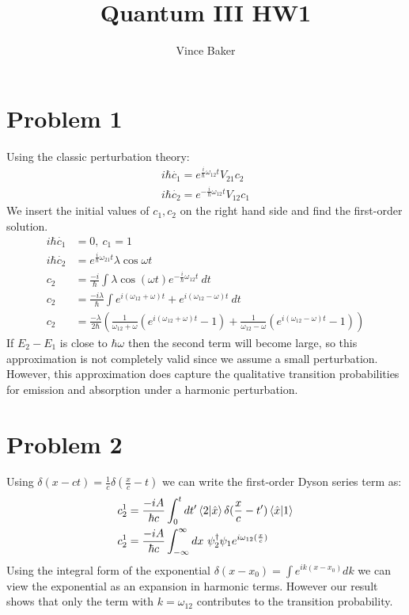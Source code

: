 \documentclass[a4paper,11pt]{article}
\title{Quantum III HW1}
\author{Vince Baker}
\numberwithin{equation}{section}
\begin{document}
\maketitle

\section{Problem 1}
Using the classic perturbation theory:
\begin{align}
 i\hbar \dot{c_1}=e^{\frac{i}{\hbar}\omega_{12}t}V_{21}c_2\\
 i\hbar \dot{c_2}=e^{-\frac{i}{\hbar}\omega_{12}t}V_{12}c_1
\end{align}
We insert the initial values of $c_1,c_2$ on the right hand side and find the first-order solution.
\begin{align}
 i\hbar \dot{c_1} &=0,\ c_1=1\\
 i\hbar \dot{c_2} &=e^{\frac{i}{\hbar}\omega_{21}t}\lambda\cos{\omega t}\\
 c_2 &=\frac{-i}{\hbar}\int \lambda \cos{(\omega t)}e^{-\frac{i}{\hbar}\omega_{12}t}\ dt\\
 c_2 &=\frac{-i\lambda}{\hbar}\int e^{i(\omega_{12}+\omega)t}+e^{i(\omega_{12}-\omega)t}\ dt\\
 c_2 &= \frac{-\lambda}{2\hbar}\left(\frac{1}{\omega_{12}+\omega}(e^{i(\omega_{12}+\omega)t}-1)+ 
	\frac{1}{\omega_{12}-\omega}(e^{i(\omega_{12}-\omega)t}-1)\right)
\end{align}
If $E_2-E_1$ is close to $\hbar \omega$ then the second term will become large, so this approximation is not completely valid since we assume a small perturbation.
However, this approximation does capture the qualitative transition probabilities for emission and absorption under a harmonic perturbation.
\
\section{Problem 2}
Using $\delta (x-ct)=\frac{1}{c}\delta(\frac{x}{c}-t)$ we can write the first-order Dyson series term as:
\begin{align}
 c_2^1 &= \frac{-iA}{\hbar c}\int_0^t dt^\prime\braket{2|\hat{x}}\delta(\frac{x}{c}-t^\prime)\braket{\hat{x}|1}\\
 c_2^1 &= \frac{-iA}{\hbar c}\int_{-\infty}^\infty dx\ \psi^\dagger_2\psi_1e^{i\omega_{12}(\frac{x}{c})}
\end{align}
Using the integral form of the exponential $\delta(x-x_0)=\int e^{ik(x-x_0)}dk$ we can view the exponential as an expansion in harmonic terms.
However our result shows that only the term with $k=\omega_{12}$ contributes to the transition probability.
\end{document}
